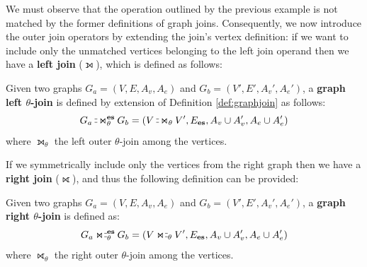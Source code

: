 We must observe that the operation outlined by the previous example is not matched by the former definitions of graph joins.
Consequently, we now introduce the outer join operators by extending the join's vertex definition: if we want to
include only the unmatched vertices belonging to the left join operand then we have a \textbf{left  join} ($\leftouterjoin$), which is defined as follows:

\begin{definition}\label{def:leftjoin}
	\label{def:graphleftjoin} 
	Given two graphs $G_a=(V,E,A_v,A_e)$ and $G_b=(V',E',A_v',A_e')$, a \textbf{graph left
		$\theta$-join} is defined by extension of Definition \ref{def:graphjoin} as follows:
	\begin{equation*}
	G_a\leftouterjoin_\theta^{\textbf{\textup{es}}} G_b=(V\leftouterjoin_\theta V',E_{\textup{\textbf{es}}},A_v\cup A_v',A_e\cup A_e')
	\end{equation*}
	where $\leftouterjoin_\theta$ the left outer $\theta$-join  among the vertices.
\end{definition}

If we  symmetrically include only the vertices from the right graph then we have a \textbf{right  join} ($\rightouterjoin$), and thus the following definition can be provided:

\begin{definition}\label{def:rightjoin}
	\label{def:graphrightjoin} 
	Given two graphs $G_a=(V,E,A_v,A_e)$ and $G_b=(V',E',A_v',A_e')$, a \textbf{graph right
		$\theta$-join} is defined as:
	\begin{equation*}
	G_a\rightouterjoin_\theta^{\textbf{\textup{es}}} G_b=(V\rightouterjoin_\theta V',E_{\textup{\textbf{es}}},A_v\cup A_v',A_e\cup A_e')
	\end{equation*}
	where $\rightouterjoin_\theta$ the right outer $\theta$-join  among the vertices.
\end{definition}

